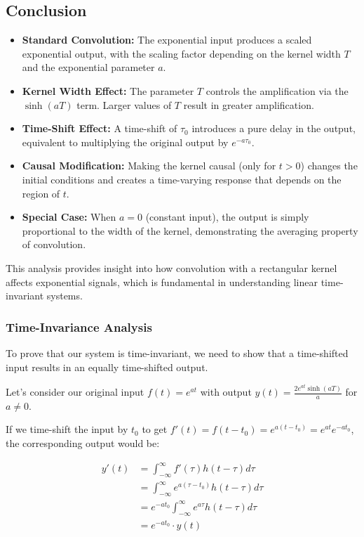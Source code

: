 \subsection{Conclusion}
\begin{itemize}
    \item \textbf{Standard Convolution:} The exponential input produces a scaled exponential output, with the scaling factor depending on the kernel width $T$ and the exponential parameter $a$.
    
    \item \textbf{Kernel Width Effect:} The parameter $T$ controls the amplification via the $\sinh(aT)$ term. Larger values of $T$ result in greater amplification.
    
    \item \textbf{Time-Shift Effect:} A time-shift of $\tau_0$ introduces a pure delay in the output, equivalent to multiplying the original output by $e^{-a\tau_0}$.
    
    \item \textbf{Causal Modification:} Making the kernel causal (only for $t > 0$) changes the initial conditions and creates a time-varying response that depends on the region of $t$.
    
    \item \textbf{Special Case:} When $a = 0$ (constant input), the output is simply proportional to the width of the kernel, demonstrating the averaging property of convolution.
\end{itemize}

This analysis provides insight into how convolution with a rectangular kernel affects exponential signals, which is fundamental in understanding linear time-invariant systems.
\subsubsection{Time-Invariance Analysis}
To prove that our system is time-invariant, we need to show that a time-shifted input results in an equally time-shifted output. 

Let's consider our original input $f(t) = e^{at}$ with output $y(t) = \frac{2e^{at}\sinh(aT)}{a}$ for $a \neq 0$.

If we time-shift the input by $t_0$ to get $f'(t) = f(t-t_0) = e^{a(t-t_0)} = e^{at}e^{-at_0}$, the corresponding output would be:

\begin{align}
y'(t) &= \int_{-\infty}^{\infty} f'(\tau)h(t-\tau)d\tau \\
&= \int_{-\infty}^{\infty} e^{a(\tau-t_0)}h(t-\tau)d\tau \\
&= e^{-at_0}\int_{-\infty}^{\infty} e^{a\tau}h(t-\tau)d\tau \\
&= e^{-at_0} \cdot y(t)
\end{align}

